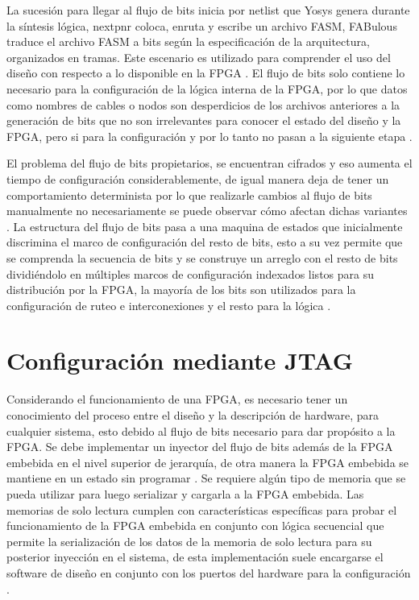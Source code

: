 La sucesión para llegar al flujo de bits inicia por netlist que Yosys genera durante la síntesis lógica, nextpnr coloca, enruta y escribe un archivo FASM, FABulous traduce el archivo FASM a bits según la especificación de la arquitectura, organizados en tramas. Este escenario es utilizado para comprender el uso del diseño con respecto a lo disponible en la FPGA \cite{J_note2008}. El flujo de bits solo contiene lo necesario para la configuración de la lógica interna de la FPGA, por lo que datos como nombres de cables o nodos son desperdicios de los archivos anteriores a la generación de bits que no son irrelevantes para conocer el estado del diseño y la FPGA, pero si para la configuración y por lo tanto no pasan a la siguiente etapa \cite{J_note2008, shan2019fpga}.

El problema del flujo de bits propietarios, se encuentran cifrados y eso aumenta el tiempo de configuración considerablemente, de igual manera deja de tener un comportamiento determinista por lo que realizarle cambios al flujo de bits manualmente no necesariamente se puede observar cómo afectan dichas variantes \cite{J_note2008}. La estructura del flujo de bits pasa a una maquina de estados que inicialmente discrimina el marco de configuración del resto de bits, esto a su vez permite que se comprenda la secuencia de bits y se construye un arreglo con el resto de bits dividiéndolo en múltiples marcos de configuración indexados listos para su distribución por la FPGA, la mayoría de los bits son utilizados para la configuración de ruteo e interconexiones y el resto para la lógica \cite{J_note2008}. 

\section{Configuración mediante JTAG}
Considerando el funcionamiento de una FPGA, es necesario tener un conocimiento del proceso entre el diseño y la descripción de hardware, para cualquier sistema, esto debido al flujo de bits necesario para dar propósito a la FPGA. Se debe implementar un inyector del flujo de bits además de la FPGA embebida en el nivel superior de jerarquía, de otra manera la FPGA embebida se mantiene en un estado sin programar \cite{nelsonBoundaryScan, xjtagWhatIsJtag}. Se requiere algún tipo de memoria que se pueda utilizar para luego serializar y cargarla a la FPGA embebida. Las memorias de solo lectura cumplen con características específicas para probar el funcionamiento de la FPGA   embebida en conjunto con lógica secuencial que permite la serialización de los datos de la memoria de solo lectura para su posterior inyección en el sistema, de esta implementación suele encargarse el software de diseño en conjunto con los puertos del hardware para la configuración \cite{ieee1149, nelsonBoundaryScan}.

